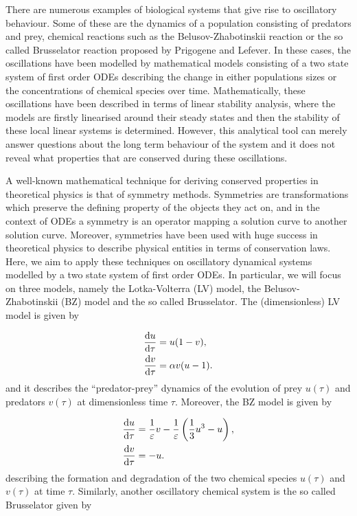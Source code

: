 There are numerous examples of biological systems that give rise to oscillatory behaviour. Some of these are the dynamics of a population consisting of predators and prey, chemical reactions such as the Belusov-Zhabotinskii reaction or the so called Brusselator reaction proposed by Prigogene and Lefever. In these cases, the oscillations have been modelled by mathematical models consisting of a two state system of first order ODEs describing the change in either populations sizes or the concentrations of chemical species over time. Mathematically, these oscillations have been described in terms of linear stability analysis, where the models are firstly linearised around their steady states and then the stability of these local linear systems is determined. However, this analytical tool can merely answer questions about the long term behaviour of the system and it does not reveal what properties that are conserved during these oscillations.

A well-known mathematical technique for deriving conserved properties in theoretical physics is that of symmetry methods. Symmetries are transformations which preserve the defining property of the objects they act on, and in the context of ODEs a symmetry is an operator mapping a solution curve to another solution curve. Moreover, symmetries have been used with huge success in theoretical physics to describe physical entities in terms of conservation laws. Here, we aim to apply these techniques on oscillatory dynamical systems modelled by a two state system of first order ODEs. In particular, we will focus on three models, namely the Lotka-Volterra (LV) model, the Belusov-Zhabotinskii (BZ) model and the so called Brusselator. The (dimensionless) LV model is given by 

\begin{equation}
  \begin{split}
    \dv{u}{\tau}&=u(1-v),\\
    \dv{v}{\tau}&=\alpha v(u-1).\\    
    \end{split}
  \label{eq:LV}
\end{equation}
and it describes the ``predator-prey'' dynamics of the evolution of prey $u(\tau)$ and predators $v(\tau)$ at dimensionless time $\tau$. Moreover, the BZ model is given by

\begin{equation}
  \begin{split}
    \dv{u}{\tau}&=\dfrac{1}{\varepsilon}v-\dfrac{1}{\varepsilon}\left(\dfrac{1}{3}u^3-u\right),\\
    \dv{v}{\tau}&=-u.\\    
    \end{split}
  \label{eq:BZ}
\end{equation}
describing the formation and degradation of the two chemical species $u(\tau)$ and $v(\tau)$ at time $\tau$. Similarly, another oscillatory chemical system is the so called Brusselator given by

